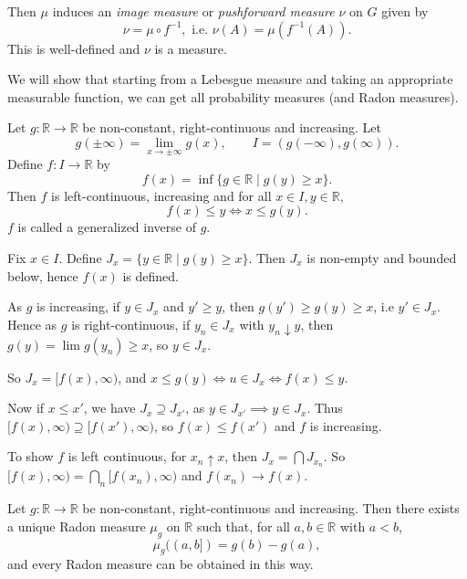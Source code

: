 \documentclass[12pt]{article}
\begin{document}
Then $\mu$ induces an \emph{image measure} or \emph{pushforward measure} $\nu$ on $G$ given by
\[
	\nu = \mu \circ f^{-1}, \text{ i.e. } \nu(A) = \mu(f^{-1}(A)).
\]
This is well-defined and $\nu$ is a measure.

We will show that starting from a Lebesgue measure and taking an appropriate measurable function, we can get all probability measures (and Radon measures).

\begin{lemma}
	Let $g : \mathbb{R} \to \mathbb{R}$ be non-constant, right-continuous and increasing. Let 
	\[
	g(\pm \infty) = \lim_{x \to \pm \infty} g(x), \qquad I = (g(-\infty), g(\infty)).
	\]
	Define $f : I \to \mathbb{R}$ by
	\[
		f(x) = \inf \{g \in \mathbb{R} \mid g(y) \ge x\}.
	\]
	Then $f$ is left-continuous, increasing and for all $x \in I, y \in \mathbb{R}$,
	\[
	f(x) \leq y \iff x \leq g(y).
	\]
	$f$ is called a generalized inverse of $g$.
\end{lemma}

\begin{proofbox}
	Fix $x \in I$. Define $J_x = \{y \in \mathbb{R} \mid g(y) \geq x\}$. Then $J_x$ is non-empty and bounded below, hence $f(x)$ is defined.

	As $g$ is increasing, if $y \in J_x$ and $y' \geq y$, then $g(y') \geq g(y) \geq x$, i.e $y' \in J_x$. Hence as $g$ is right-continuous, if $y_n \in J_x$ with $y_n \downarrow y$, then $g(y) = \lim g(y_n) \geq x$, so $y \in J_x$.

	So $J_x = [f(x), \infty)$, and $x \leq g(y) \iff u \in J_x \iff f(x) \leq y$.

	Now if $x \leq x'$, we have $J_x \supseteq J_{x'}$, as $y \in J_{x'} \implies y \in J_x$. Thus $[f(x), \infty) \supseteq [f(x'), \infty)$, so $f(x) \leq f(x')$ and $f$ is increasing.

	To show $f$ is left continuous, for $x_n \uparrow x$, then $J_x = \bigcap J_{x_n}$. So $[f(x), \infty) = \bigcap_n [f(x_n), \infty)$ and $f(x_n) \to f(x)$.
\end{proofbox}

\begin{theorem}
	Let $g : \mathbb{R} \to \mathbb{R}$ be non-constant, right-continuous and increasing. Then there exists a unique Radon measure $\mu_g$ on $\mathbb{R}$ such that, for all $a, b \in \mathbb{R}$ with $a < b$,
	\[
		\mu_g((a,b]) = g(b) - g(a),
	\]
	and every Radon measure can be obtained in this way.
\end{theorem}
\end{document}
